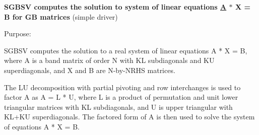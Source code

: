 {\bfseries  S\+G\+B\+S\+V computes the solution to system of linear equations \hyperlink{classA}{A} $\ast$ X = B for G\+B matrices} (simple driver) 

 \begin{DoxyParagraph}{Purpose\+: }
\begin{DoxyVerb} SGBSV computes the solution to a real system of linear equations
 A * X = B, where A is a band matrix of order N with KL subdiagonals
 and KU superdiagonals, and X and B are N-by-NRHS matrices.

 The LU decomposition with partial pivoting and row interchanges is
 used to factor A as A = L * U, where L is a product of permutation
 and unit lower triangular matrices with KL subdiagonals, and U is
 upper triangular with KL+KU superdiagonals.  The factored form of A
 is then used to solve the system of equations A * X = B.\end{DoxyVerb}
 
\end{DoxyParagraph}

